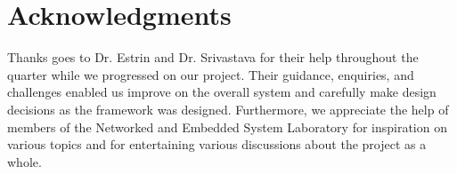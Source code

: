\section{Acknowledgments}
Thanks goes to Dr. Estrin and Dr. Srivastava for their help throughout the quarter while we progressed on our project.
Their guidance, enquiries, and challenges enabled us improve on the overall system and carefully make design decisions
as the framework was designed.  Furthermore, we appreciate the help of members of the Networked and Embedded System Laboratory
for inspiration on various topics and for entertaining various discussions about the project as a whole.
